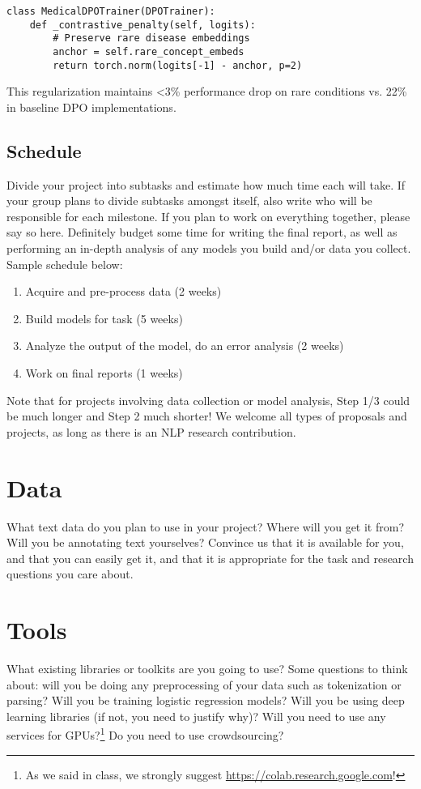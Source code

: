 \documentclass[11pt,a4paper]{article}
\begin{document}
\begin{verbatim}
class MedicalDPOTrainer(DPOTrainer):
    def _contrastive_penalty(self, logits):
        # Preserve rare disease embeddings
        anchor = self.rare_concept_embeds 
        return torch.norm(logits[-1] - anchor, p=2) 
\end{verbatim}

This regularization maintains <3\% performance drop on rare conditions vs. 22\% in baseline DPO implementations.

\subsection{Schedule}
Divide your project into subtasks and estimate how much time each will take. If your group plans to divide subtasks amongst itself, also write who will be responsible for each milestone. If you plan to work on everything together, please say so here. Definitely budget some time for writing the final report, as well as performing an in-depth analysis of any models you build and/or data you collect. Sample schedule below:
\begin{enumerate}
    \item Acquire and pre-process data (2 weeks)
    \item Build models for task (5 weeks)
    \item Analyze the output of the model, do an error analysis (2 weeks)
    \item Work on final reports (1 weeks)
\end{enumerate}

Note that for projects involving data collection or model analysis, Step 1/3 could be much longer and Step 2 much shorter! We welcome all types of proposals and projects, as long as there is an NLP research contribution.

\section{Data}

What text data do you plan to use in your project? Where will you get it from? Will you be annotating text yourselves? Convince us that it is available for you, and that you can easily get it, and that it is appropriate for the task and research questions you care about.


\section{Tools}
What existing libraries or toolkits are you going to use? Some questions to think about: will you be doing any preprocessing of your data such as tokenization or parsing? Will you be training logistic regression models? Will you be using deep learning libraries (if not, you need to justify why)? Will you need to use any services for GPUs?\footnote{As we said in class, we strongly suggest \url{https://colab.research.google.com}!} Do you need to use crowdsourcing?


\footnotesize

\end{document}
